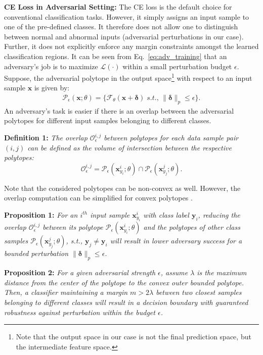 \documentclass[10pt,twocolumn,letterpaper]{article}
\newcommand{\bx}{{\bm x}}
\newcommand{\bdelta}{{\bm \delta}}
\begin{document}
\noindent \textbf{CE Loss in Adversarial Setting:} The CE loss is the default choice for conventional classification tasks. However, it simply assigns an input sample to one of the pre-defined classes. It therefore does not allow one to distinguish between normal and abnormal inputs (adversarial perturbations in our case). Further, it does not explicitly enforce any margin constraints amongst the learned classification regions. It can be seen from Eq.~\ref{eq:adv_training} that an adversary's job is to maximize $\mathcal{L}(\cdot)$ within a small perturbation budget $\epsilon$. Suppose, the adversarial polytope in the output space\footnote{Note that the output space in our case is not the final prediction space, but the intermediate feature space.} with respect to an input sample $\bm{x}$ is given by:
\begin{align}
    \mathcal{P}_{\epsilon}(\bx; \theta) = \{\mathcal{F}_{\theta}(\bx +\bdelta) \;s.t., \, {\parallel}\bdelta{\parallel}_p \leq \epsilon\}.
\end{align}
An adversary's task is easier if there is an overlap between the adversarial polytopes for different input samples belonging to different classes. 

\noindent
\textbf{Definition 1:} \emph{The overlap $\mathcal{O}_{\epsilon}^{i,j}$ between polytopes for each data sample pair $(i,j)$ can be defined as the volume of intersection between the respective polytopes:}
$$ \mathcal{O}_{\epsilon}^{i,j} = \mathcal{P}_{\epsilon}(\bx^i_{y_i}; \theta) \cap \mathcal{P}_{\epsilon}(\bx^j_{y_j}; \theta).$$

\noindent Note that the considered polytopes can be non-convex as well. However, the overlap computation can be simplified for convex polytopes \cite{de1998computing}. 

\noindent
\textbf{Proposition 1:} \emph{For an $i^{th}$ input sample $\bx^{i}_{y_i}$ with class label $\bm{y}_i$, reducing the overlap $\mathcal{O}_{\epsilon}^{i,j}$ between its polytope $\mathcal{P}_{\epsilon}(\bx^i_{y_i}; \theta)$ and the polytopes of other class samples $\mathcal{P}_{\epsilon}(\bx^j_{y_j}; \theta)$, s.t., $\bm{y}_j\neq \bm{y}_i$ will result in lower adversary success for a bounded perturbation ${\parallel}\bdelta{\parallel}_p \leq \epsilon$.}


\noindent
\textbf{Proposition 2:} \emph{For a given adversarial strength $\epsilon$, assume $\lambda$ is the maximum distance from the center of the polytope to the convex outer bounded polytope. Then, a classifier maintaining a margin $m>2\lambda$ between two closest samples belonging to different classes will result in a decision boundary with guaranteed robustness against perturbation within the budget $\epsilon$.}
\end{document}
